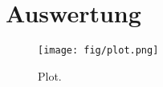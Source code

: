 \section{Auswertung}
\label{sec:Auswertung}

\begin{figure}
  \centering
  \texttt{[image: fig/plot.png]}
  \caption{Plot.}
  \label{fig:plot}
\end{figure}
